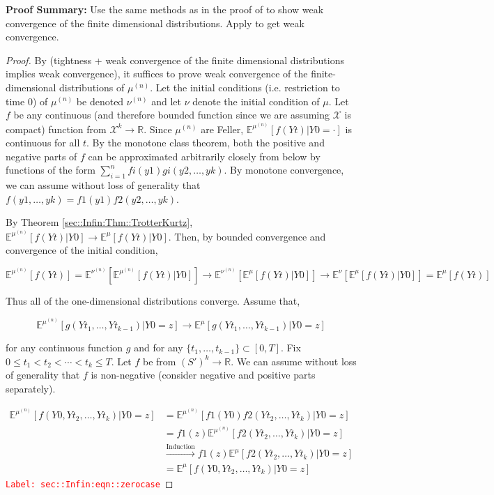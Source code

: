 \documentclass[12pt]{article}
\newcommand{\mb}{\mathbb}
\newcommand{\mc}{\mathcal}
\newcommand{\ra}{\rightarrow}
\newcommand{\os}{\overset}
\newcommand{\te}{\text}
\newcommand{\tr}{\textcolor{red}}
\newcommand{\labe}[1]{\tr{\texttt{Label: #1}}}
\newcommand{\pfsum}{\textbf{Proof Summary: }}
\newcommand{\ind}{\hspace{24pt}}
\newcommand{\exmu}[2]{\mb{E}^{#1}\left[#2\right]}	%
\renewcommand{\t}{t}							%
\newcommand{\sln}[1]{^{(#1)}}					%
\newcommand{\indx}[1]{_{#1}}					%
\newcommand{\m}{\mu}							%
\newcommand{\mm}{\nu}							%
\newcommand{\XX}{Y}								%
\renewcommand{\it}{k}							%
\newcommand{\spce}{\mc{X}}						%
\newcommand{\xx}{y}								%
\newcommand{\xxx}{z}							%
\begin{document}
\pfsum Use the same methods as in the proof of \cite[Theorem 4.2]{Kur81} to show weak convergence of the finite dimensional distributions. Apply \cite[Theorem 13.1]{Bil99} to get weak convergence.

\begin{proof}
By \cite[Theorem 13.1]{Bil99} (tightness + weak convergence of the finite dimensional distributions implies weak convergence), it suffices to prove weak convergence of the finite-dimensional distributions of \(\m\sln{n}\). Let the initial conditions (i.e. restriction to time 0) of \(\m\sln{n}\) be denoted \(\mm\sln{n}\) and let \(\mm\) denote the initial condition of \(\m\). Let \(f\) be any continuous (and therefore bounded function since we are assuming \(\spce\) is compact) function from \(\spce^k\ra\mb{R}\). Since \(\m\sln{n}\) are Feller, \(\exmu{\m\sln{n}}{f(\XX{}{\t})|\XX{}{0} = \cdot}\) is continuous for all \(\t\). By the monotone class theorem, both the positive and negative parts of \(f\) can be approximated arbitrarily closely from below by functions of the form \(\sum_{i=1}^n f{i}(\xx{1})g{i}(\xx{2},\dots,\xx{\it})\). By monotone convergence, we can assume without loss of generality that \(f(\xx{1},\dots,\xx{\it}) = f{1}(\xx{1})f{2}(\xx{2},\dots,\xx{\it})\).

\ind By Theorem \ref{sec::Infin:Thm::TrotterKurtz}, \(\exmu{\m\sln{n}}{f(\XX{}{\t})|\XX{}{0}} \ra \exmu{\m}{f(\XX{}{\t})|\XX{}{0}}\). Then, by bounded convergence and convergence of the initial condition,

\[\exmu{\m\sln{n}}{f(\XX{}{\t})}  = \exmu{\mm\sln{n}}{\exmu{\m\sln{n}}{f(\XX{}{\t})|\XX{}{0}}} \ra \exmu{\mm\sln{n}}{\exmu{\m}{f(\XX{}{\t})|\XX{}{0}}} \ra \exmu{\mm}{\exmu{\m}{f(\XX{}{\t})|\XX{}{0}}} = \exmu{\m}{f(\XX{}{\t})}\]

Thus all of the one-dimensional distributions converge. Assume that,

\[\exmu{\m\sln{n}}{g(\XX{}{\t\indx{1}},\dots,\XX{}{\t\indx{k-1}})|\XX{}{0}=\xxx} \ra \exmu{\m}{g(\XX{}{\t\indx{1}},\dots,\XX{}{\t\indx{k-1}})|\XX{}{0}=\xxx}\]

\noindent for any continuous function \(g\) and for any \(\{\t\indx{1},\dots,\t\indx{k-1}\} \subset [0,T]\). Fix \(0\leq \t\indx{1} <\t\indx{2} <\cdots < \t\indx{\it}\leq T\). Let \(f\) be from \((S')^k \ra \mb{R}\). We can assume without loss of generality that \(f\) is non-negative (consider negative and positive parts separately).

\begin{align}
\exmu{\m\sln{n}}{f(\XX{}{0},\XX{}{\t\indx{2}},\dots,\XX{}{\t\indx{\it}})|\XX{}{0} = \xxx}&= \exmu{\m\sln{n}}{f{1}(\XX{}{0})f{2}(\XX{}{\t\indx{2}},\dots,\XX{}{\t\indx{k}})|\XX{}{0}=\xxx}\nonumber\\
&= f{1}(\xxx)\exmu{\m\sln{n}}{f{2}(\XX{}{\t\indx{2}},\dots,\XX{}{\t\indx{k}})|\XX{}{0}=\xxx}\nonumber\\
&\os{\te{Induction}}{\ra} f{1}(\xxx)\exmu{\m}{f{2}(\XX{}{\t\indx{2}},\dots,\XX{}{\t\indx{k}})|\XX{}{0}=\xxx}\nonumber\\
&= \exmu{\m}{f(\XX{}{0},\XX{}{\t\indx{2}},\dots,\XX{}{\t\indx{\it}})|\XX{}{0}=\xxx}
\label{sec::Infin:eqn::zerocase}
\end{align}
\labe{sec::Infin:eqn::zerocase}


\end{proof}
\end{document}
